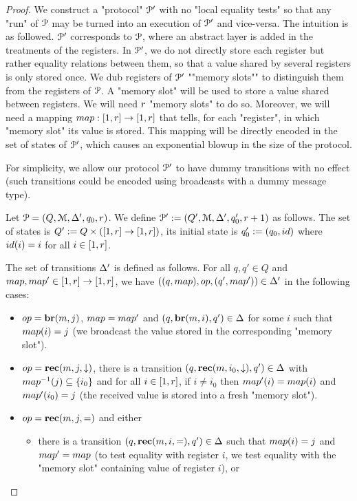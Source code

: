\begin{proof}
	We construct a "protocol" $\mathcal{P}'$ with no "local equality tests" so that any "run" of $\mathcal{P}$ may be turned into an execution of $\mathcal{P}'$ and vice-versa. 
	The intuition is as followed. $\mathcal{P}'$ corresponds to $\mathcal{P}$, where an abstract layer is added in the treatments of the registers. In $\mathcal{P}'$, we do not directly store each register but rather equality relations between them, so that a value shared by several registers is only stored once. We dub registers of $\mathcal{P}'$ ""memory slots"" to distinguish them from the registers of $\mathcal{P}$. A "memory slot" will be used to store a value shared between registers. 
	We will need $r$ "memory slots" to do so. Moreover, we will need a mapping $\map : \nset{1}{r} \to \nset{1}{r}$ that tells, for each "register", in which "memory slot" its value is stored. This mapping will be directly encoded in the set of states of $\mathcal{P}'$, which causes an exponential blowup in the size of the protocol.
	
	For simplicity, we allow our protocol $\mathcal{P}'$ to have dummy transitions with no effect (such transitions could be encoded using broadcasts with a dummy message type). 
	
	Let $\mathcal{P} = (Q, \mathcal{M}, \Delta', q_0, r)$. 
	We define $\mathcal{P}' := (Q', \mathcal{M}, \Delta', q_0', r +1)$ as follows. The set of states is $Q' := Q \times ([1,r] \to [1,r])$, its initial state is $q_0' := (q_0, \idmap)$ where $\idmap(i) = i$ for all $i \in [1,r]$. 
	
	The set of transitions $\Delta'$ is defined as follows.
	For all $q,q' \in Q$ and $\map, \map' \in \nset{1}{r} \to \nset{1}{r}$, we have $((q, \map), \op, (q', \map')) \in \transitions'$ in the following cases:
	
	\begin{itemize}
		\item $\op = \br{m}{j}$, 
		$\map = \map'$ and $(q, \textbf{br}(m, i), q') \in \Delta$ for some $i$ such that $\map(i) = j$ (we broadcast the value stored in the corresponding "memory slot").
		
		\item $\op=\rec{m}{j}{\enregact}$, there is a transition $(q, \textbf{rec}(m, i_0, \downarrow), q') \in \Delta$ with $\map^{-1}(j) \subseteq \set{i_0}$ and for all $i \in [1,r]$, if $i \ne i_0$ then $\map'(i) = \map(i)$ and $\map'(i_0) = j$ (the received value is stored into a fresh "memory slot").
		
		\item $\op = \rec{m}{j}{\eqtestact}$ and either
		\begin{itemize}
			\item there is a transition $(q, \textbf{rec}(m, i, {=}), q') \in \Delta$ such that $\map(i)=j$ and $\map'=\map$ (to test equality with register $i$, we test equality with the "memory slot" containing value of register $i$), or
			

\end{itemize}
\end{itemize}
\end{proof}
